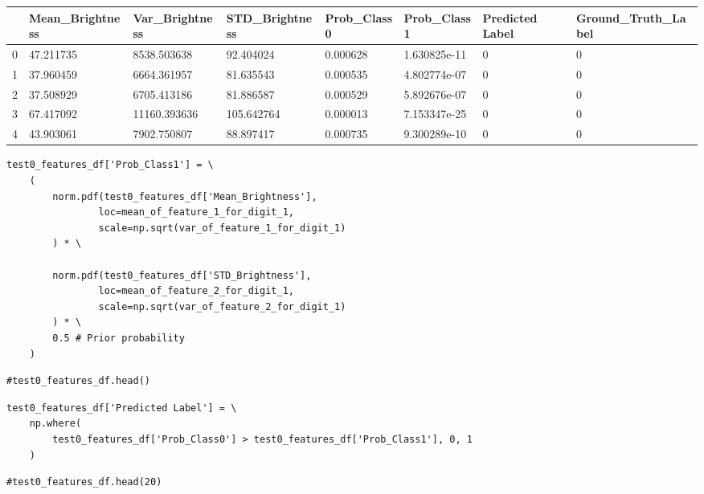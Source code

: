 \bigskip\noindent
\begin{tabular}{p{}p{}p{}p{}p{}p{}p{}p{}}
\toprule
 & Mean\_Brightness & Var\_Brightness & STD\_Brightness & Prob\_Class0 & Prob\_Class1 & Predicted Label & Ground\_Truth\_Label \\
\hline
0 & 47.211735 & 8538.503638 & 92.404024 & 0.000628 & 1.630825e-11 & 0 & 0 \\
\hline
1 & 37.960459 & 6664.361957 & 81.635543 & 0.000535 & 4.802774e-07 & 0 & 0 \\
\hline
2 & 37.508929 & 6705.413186 & 81.886587 & 0.000529 & 5.892676e-07 & 0 & 0 \\
\hline
3 & 67.417092 & 11160.393636 & 105.642764 & 0.000013 & 7.153347e-25 & 0 & 0 \\
\hline
4 & 43.903061 & 7902.750807 & 88.897417 & 0.000735 & 9.300289e-10 & 0 & 0 \\
\hline
\bottomrule
\end{tabular}

\bigskip

\begin{verbatim}
test0_features_df['Prob_Class1'] = \
    (
        norm.pdf(test0_features_df['Mean_Brightness'],
                loc=mean_of_feature_1_for_digit_1,
                scale=np.sqrt(var_of_feature_1_for_digit_1)
        ) * \

        norm.pdf(test0_features_df['STD_Brightness'],
                loc=mean_of_feature_2_for_digit_1,
                scale=np.sqrt(var_of_feature_2_for_digit_1)
        ) * \
        0.5 # Prior probability
    )
\end{verbatim}

\begin{verbatim}
#test0_features_df.head()
\end{verbatim}

\begin{verbatim}
test0_features_df['Predicted Label'] = \
    np.where(
        test0_features_df['Prob_Class0'] > test0_features_df['Prob_Class1'], 0, 1
    )
\end{verbatim}

\begin{verbatim}
#test0_features_df.head(20)
\end{verbatim}

